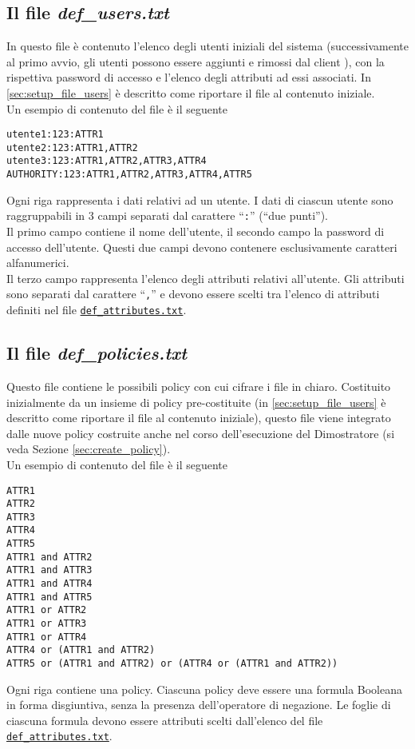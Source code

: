 \documentclass[a4paper,twoside,10pt,openany]{scrbook}
\begin{document}
\subsection{Il file \emph{def\_users.txt}}\label{sec:file_users}
In questo file è contenuto l'elenco degli utenti iniziali del sistema (successivamente al primo avvio, gli utenti possono essere aggiunti e rimossi dal client \auth), con la rispettiva password di accesso e l'elenco degli attributi ad essi associati. In \ref{sec:setup_file_users} è descritto come riportare il file al contenuto iniziale.\\
Un esempio di contenuto del file è il seguente
\begin{verbatim}
utente1:123:ATTR1
utente2:123:ATTR1,ATTR2
utente3:123:ATTR1,ATTR2,ATTR3,ATTR4
AUTHORITY:123:ATTR1,ATTR2,ATTR3,ATTR4,ATTR5
\end{verbatim}
Ogni riga rappresenta i dati relativi ad un utente. I dati di ciascun utente sono raggruppabili in 3 campi separati dal carattere ``\texttt{:}'' (``due punti''). \\
Il primo campo contiene il nome dell'utente, il secondo campo la password di accesso dell'utente. Questi due campi devono contenere esclusivamente caratteri alfanumerici.\\
Il terzo campo rappresenta l'elenco degli attributi relativi all'utente. Gli attributi sono separati dal carattere ``\texttt{,}'' e devono essere scelti tra l'elenco di attributi definiti nel file \hyperref[sec:file_attributes]{\texttt{def\_attributes.txt}}.
%
\subsection{Il file \emph{def\_policies.txt}}\label{sec:file_policies}
Questo file contiene le possibili policy con cui cifrare i file in chiaro. Costituito inizialmente da un insieme di policy pre-costituite (in \ref{sec:setup_file_users} è descritto come riportare il file al contenuto iniziale), questo file viene integrato dalle nuove policy costruite anche nel corso dell'esecuzione del Dimostratore (si veda Sezione \ref{sec:create_policy}).\\
Un esempio di contenuto del file è il seguente
\begin{verbatim}
ATTR1
ATTR2
ATTR3
ATTR4
ATTR5
ATTR1 and ATTR2
ATTR1 and ATTR3
ATTR1 and ATTR4
ATTR1 and ATTR5
ATTR1 or ATTR2
ATTR1 or ATTR3
ATTR1 or ATTR4
ATTR4 or (ATTR1 and ATTR2)
ATTR5 or (ATTR1 and ATTR2) or (ATTR4 or (ATTR1 and ATTR2))
\end{verbatim}
Ogni riga contiene una policy.
Ciascuna policy deve essere una formula Booleana in forma disgiuntiva, senza la presenza dell'operatore di negazione. Le foglie di ciascuna formula devono essere attributi scelti dall'elenco del file \hyperref[sec:file_attributes]{\texttt{def\_attributes.txt}}.
%
\end{document}

